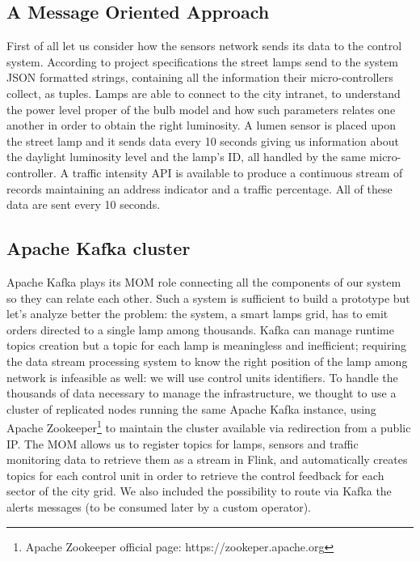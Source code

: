 \subsection{A Message Oriented Approach}
First of all let us consider how the sensors network sends its data to the control system. According to project specifications the street lamps send to the system JSON formatted strings, containing all the information their micro-controllers collect, as tuples. Lamps are able to connect to the city intranet, to understand the power level proper of the bulb model and how such parameters relates one another in order to obtain the right luminosity.
 A lumen sensor is placed upon the street lamp and it sends data every 10 seconds giving us information about the daylight luminosity level and the lamp's ID, all handled by the same micro-controller.
 A traffic intensity API is available to produce a continuous stream of records maintaining an address indicator and a traffic percentage. All of these data are sent every 10 seconds.

\subsection{Apache Kafka cluster}
 Apache Kafka plays its MOM role connecting all the components of our system so they can relate each other. Such a system is sufficient to build a prototype but let’s analyze better the problem: the system, a smart lamps grid, has to emit orders directed to a single lamp among thousands. Kafka can manage runtime topics creation but a topic for each lamp is meaningless and inefficient; requiring the data stream processing system to know the right position of the lamp among network is infeasible as well: we will use control units identifiers.
To handle the thousands of data necessary to manage the infrastructure, we thought to use a cluster of replicated nodes running the same Apache Kafka instance, using Apache Zookeeper\footnote{Apache Zookeeper official page: https://zookeper.apache.org} to maintain the cluster available via redirection from a public IP. The MOM allows us to register topics for lamps, sensors and traffic monitoring data to retrieve them as a stream in Flink, and automatically creates topics for each control unit in order to retrieve the control feedback for each sector of the city grid. We also included the possibility to route via Kafka the alerts messages (to be consumed later by a custom operator).

